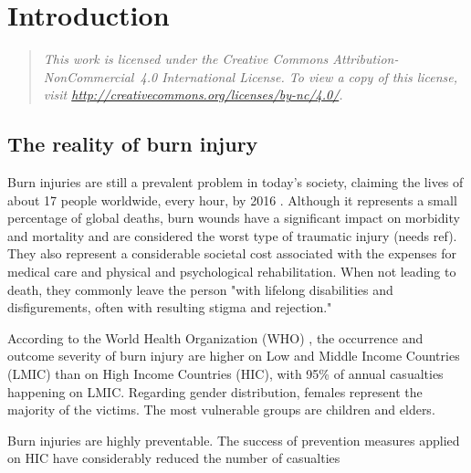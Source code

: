 \newcommand{\novathesis}{\emph{novathesis}}
\newcommand{\novathesisclass}{\texttt{novathesis.cls}}


\chapter{Introduction}
\label{cha:introduction}

\begin{quotation}
  \itshape
  This work is licensed under the Creative Commons Attribution-NonCommercial~4.0 International License.
  To view a copy of this license, visit \url{http://creativecommons.org/licenses/by-nc/4.0/}.
\end{quotation}

\section{The reality of burn injury} %
\label{sec:the_reality_of_burn_injury}

Burn injuries are still a prevalent problem in today's society, claiming the lives of about 17 people worldwide, every hour, by 2016 \cite{GHE2016_xls}. Although it represents a small percentage of global deaths, burn wounds have a significant impact on morbidity and mortality and are considered the worst type of traumatic injury {\color{red}(needs ref)}. They also represent a considerable societal cost associated with the expenses for medical care and physical and psychological rehabilitation. When not leading to death, they commonly leave the person "with lifelong disabilities and disfigurements, often with resulting stigma and rejection." \cite{who2011_sucess_stories}

According to the World Health Organization (WHO) \cite{who2011_sucess_stories}, the occurrence and outcome severity of burn injury are higher on Low and Middle Income Countries (LMIC) than on High Income Countries (HIC), with 95\% of annual casualties happening on LMIC. Regarding gender distribution, females represent the majority of the victims. The most vulnerable groups are children and elders.

Burn injuries are highly preventable. The success of prevention measures applied on HIC have considerably reduced the number of casualties  

